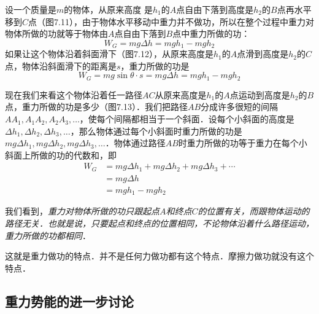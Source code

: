设一个质量是$m$的物体，从原来高度
是$h_1$的$A$点自由下落到高度是$h_2$的$B$点再水平移到$C$点（图7.11），由于物体水平移动中重力并不做功，所以在整个过程中重力对物体所做的功就等于物体由$A$点自由下落到$B$点中重力所做的功：
\[W_G=mg\Delta h=mgh_1-mgh_2\]
如果让这个物体沿着斜面滑下（图7.12），从原来高度是$h_1$的$A$点滑到高度是$h_2$的$C$点，物体沿斜面滑下的距离是$s$，重力所做的功是
\[W_G=mg\sin\theta \cdot s=mg\Delta h=mgh_1-mgh_2\]

\begin{figure}[htp]\centering
{}
\caption{}
\end{figure}



现在我们来看这个物体沿着任一路径$AC$从原来高度是$h_1$的$A$点运动到高度是$h_2$的$B$点，重力所做的功是多少（图7.13）．我们把路径$AB$分成许多很短的间隔$AA_1,A_1A_2,A_2A_3,\ldots$，使每个间隔都相当于一个斜面．设每个小斜面的高度是$\Delta h_1,\Delta h_2,\Delta h_3,\ldots$，那么物体通过每个小斜面时重力所做的功是$mg\Delta h_1,mg\Delta h_2,mg\Delta h_3,\ldots$．物体通过路径$AB$时重力所做的功等于重力在每个小斜面上所做的功的代数和，即
\[\begin{split}
W_G&= mg\Delta h_1+mg\Delta h_2+mg\Delta h_3+\cdots\\
&=mg\Delta h\\
&=mgh_1-mgh_2
\end{split} \]

我们看到，\textit{重力对物体所做的功只跟起点$A$和终点$C$的位置有关，而跟物体运动的路径无关．也就是说，只要起点和终点的位置相同，不论物体沿着什么路径运动，重力所做的功都相同}．

这就是重力做功的特点．并不是任何力做功都有这个特点．摩擦力做功就没有这个特点．

\subsection{重力势能的进一步讨论}

